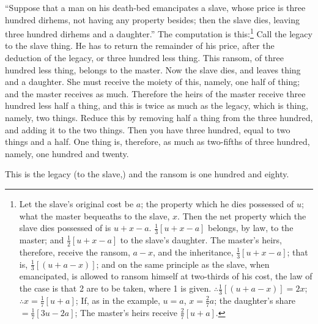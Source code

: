 ``Suppose that a man on his death-bed emancipates a slave, whose price is three hundred dirhems, not having any property besides; then the slave dies, leaving three hundred dirhems and a daughter.'' The computation is this:\footnote{Let the slave's original cost be $a$; the property which he dies possessed of $u$; what the master bequeaths to the slave, $x$. Then the net property which the slave dies possessed of is $u + x - a$. $\frac{1}{3}[u+x-a]$ belongs, by law, to the master; and $\frac{1}{2}[u+x-a]$ to the slave's daughter. The master's heirs, therefore, receive the ransom, $a-x$, and the inheritance, $\frac{1}{3}[u+x-a]$; that is, $\frac{1}{3}[(u+a-x)]$; and on the same principle as the slave, when emancipated, is allowed to ransom himself at two-thirds of his cost, the law of the case is that 2 are to be taken, where 1 is given. $\therefore \frac{1}{3}[(u+a-x)] = 2x$; $\therefore x = \frac{1}{7}[u+a]$; If, as in the example, $u=a$, $x = \frac{2}{7}a$; the daughter's share $= \frac{1}{7}[3u-2a]$; The master's heirs receive $\frac{2}{7}[u+a]$.} Call the legacy to the slave thing. He has to return the remainder of his price, after the deduction of the legacy, or three hundred less thing. This ransom, of three hundred less thing, belongs to the master. Now the slave dies, and leaves thing and a daughter. She must receive the moiety of this, namely, one half of thing; and the master receives as much. Therefore the heirs of the master receive three hundred less half a thing, and this is twice as much as the legacy, which is thing, namely, two things. Reduce this by removing half a thing from the three hundred, and adding it to the two things. Then you have three hundred, equal to two things and a half. One thing is, therefore, as much as two-fifths of three hundred, namely, one hundred and twenty.

This is the legacy (to the slave,) and the ransom is one hundred and eighty.

